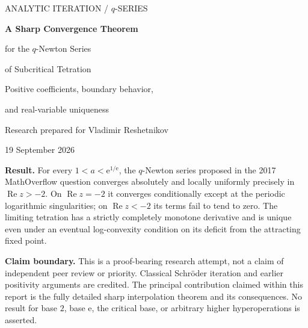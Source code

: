 \documentclass[11pt,letterpaper]{article}
\theoremstyle{definition}\newtheorem{definition}[theorem]{Definition}
\theoremstyle{remark}\newtheorem{remark}[theorem]{Remark}
\newcommand{\Ree}{\operatorname{Re}}
\newcommand{\ee}{\mathrm e}
\numberwithin{equation}{section}
\begin{document}
\begin{titlepage}
\vspace*{0.45in}
{\color{Accent}\large ANALYTIC ITERATION \enspace / \enspace $q$-SERIES}\par
\vspace{0.25in}
{\color{Ink}\Huge\bfseries A Sharp Convergence Theorem\par for the $q$-Newton Series\par of Subcritical Tetration}\par
\vspace{0.30in}
{\Large Positive coefficients, boundary behavior,\par and real-variable uniqueness}\par
\vspace{0.35in}
{\large Research prepared for Vladimir Reshetnikov}\par
{\normalsize 19 September 2026}\par
\vspace{0.35in}
\begin{tcolorbox}[colback=Pale,colframe=Accent,boxrule=0.6pt,arc=1mm]
\textbf{Result.} For every $1<a<\ee^{1/\ee}$, the $q$-Newton series proposed in the 2017 MathOverflow question converges absolutely and locally uniformly precisely in $\Ree z>-2$. On $\Ree z=-2$ it converges conditionally except at the periodic logarithmic singularities; on $\Ree z<-2$ its terms fail to tend to zero. The limiting tetration has a strictly completely monotone derivative and is unique even under an eventual log-convexity condition on its deficit from the attracting fixed point.
\end{tcolorbox}
\vspace{0.2in}
\begin{abstract}
We investigate the explicit $q$-binomial interpolation series for fractional tetration posed by Reshetnikov in 2017. A constructive Koenigs linearization of $g(u)=1-\ee^{-qu}$ produces an inverse $H$ with strictly positive Taylor coefficients. Its exact convergence radius is determined by the orbit of $1$, and its unique dominant singularity is logarithmic. These facts identify the interpolation series with the normalized Schr\"oder tetration, establish complete monotonicity, and yield asymptotics for its divided differences. In particular, the boundary of convergence can be classified completely, including logarithmic divergence of the partial sums at the real boundary point. Two independent uniqueness arguments are supplied: one through compact moment determinacy and one through eventual convexity of the logarithmic deficit. Executable Python code, exact rational identities, high-precision checks, and raw numerical tables accompany the proofs.
\end{abstract}
\vfill
{\small\color{Ink}\textbf{Claim boundary.} This is a proof-bearing research attempt, not a claim of independent peer review or priority. Classical Schr\"oder iteration and earlier positivity arguments are credited. The principal contribution claimed within this report is the fully detailed sharp interpolation theorem and its consequences. No result for base $2$, base $\ee$, the critical base, or arbitrary higher hyperoperations is asserted.}
\end{titlepage}
\end{document}
